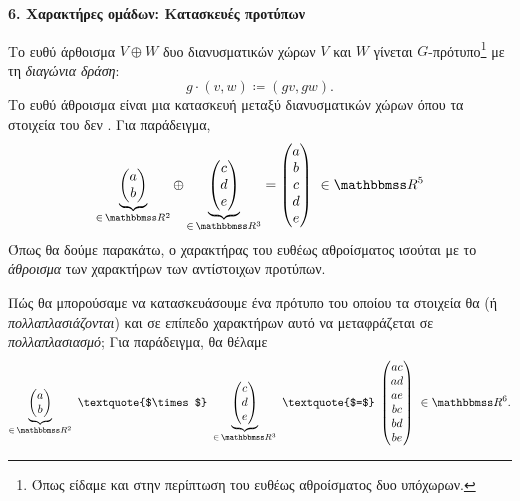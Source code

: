 \documentclass[12pt,a4paper,reqno]{amsart}
\begin{document}
\newpage

\setcounter{section}{6}
\setcounter{theorem}{0}
\begin{center}
    \textbf{6. Χαρακτήρες ομάδων: Κατασκευές προτύπων
}
\end{center}

Το ευθύ άρθοισμα $V\oplus W$ δυο διανυσματικών χώρων $V$ και $W$ γίνεται $G$-πρότυπο\footnote{Όπως είδαμε και στην περίπτωση του ευθέως αθροίσματος δυο υπόχωρων.} με τη \emph{διαγώνια δράση}:
\[
g\cdot(v,w) \coloneqq (gv,gw).
\]
Το ευθύ άθροισμα είναι μια κατασκευή μεταξύ διανυσματικών χώρων όπου τα στοιχεία του δεν . Για παράδειγμα, 
\[
\underbrace{\begin{pmatrix}
    a \\ 
    b
\end{pmatrix}}_{\in \, \RR^2}
\oplus
\underbrace{\begin{pmatrix}
    c \\ 
    d \\ 
    e
\end{pmatrix}}_{\in \, \RR^3}
=
\begin{pmatrix}
    a \\ 
    b \\ 
    c \\ 
    d \\ 
    e
\end{pmatrix} \ \in \RR^5
\]
Όπως θα δούμε παρακάτω, ο χαρακτήρας του ευθέως αθροίσματος ισούται με το \emph{άθροισμα} των χαρακτήρων των αντίστοιχων προτύπων.

Πώς θα μπορούσαμε να κατασκευάσουμε ένα πρότυπο του οποίου τα στοιχεία θα  (ή \emph{πολλαπλασιάζονται}) και σε επίπεδο χαρακτήρων αυτό να μεταφράζεται σε \emph{πολλαπλασιασμό}; Για παράδειγμα, θα θέλαμε 
\[
\underbrace{\begin{pmatrix}
    a \\ 
    b
\end{pmatrix}}_{\in \, \RR^2}
\ \text{\textquote{$\times$}} \
\underbrace{\begin{pmatrix}
    c \\ 
    d \\ 
    e
\end{pmatrix}}_{\in \, \RR^3}
\ \text{\textquote{$=$}} \
\begin{pmatrix}
    ac \\ 
    ad \\ 
    ae \\ 
    bc \\ 
    bd \\
    be
\end{pmatrix} \ \in \RR^6.
\]
\end{document}
